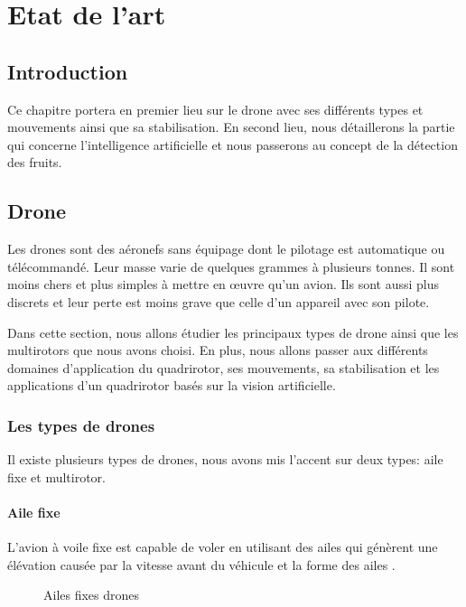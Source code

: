 \chapter{ Etat de l'art }

\clearpage
\section*{Introduction}
Ce chapitre portera en premier lieu sur le drone avec ses différents types et mouvements ainsi que sa stabilisation. En second lieu, nous détaillerons la partie qui concerne l'intelligence artificielle et nous passerons au concept de la détection des fruits. 

\section{Drone}	
Les drones sont des aéronefs sans équipage dont le pilotage est automatique ou télécommandé. Leur masse varie de quelques grammes à plusieurs tonnes\cite{Wikipideaa}. Il sont moins chers et plus simples à mettre en œuvre qu'un avion. Ils sont aussi plus discrets et leur perte est moins grave que celle d'un appareil avec son pilote.

Dans cette section, nous allons étudier les principaux types de drone ainsi que les multirotors que nous avons choisi. En plus, nous allons passer aux différents domaines d'application du quadrirotor, ses mouvements, sa stabilisation et les applications d'un quadrirotor basés sur la vision artificielle.   	
\subsection{Les types de drones}
Il existe plusieurs types de drones, nous avons mis l'accent sur deux types: aile fixe et multirotor.

\subsubsection{Aile fixe }
L'avion à voile fixe est capable de voler en utilisant des ailes qui génèrent une élévation causée par la vitesse avant du véhicule et la forme des ailes \cite{educalingo}.


\begin{figure}[H] 
	\begin{center} 
		\centering
		
		
	\end{center}
	
	\caption{Ailes fixes drones}
\end{figure}
